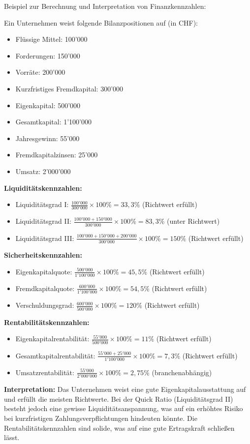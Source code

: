\begin{example}
Beispiel zur Berechnung und Interpretation von Finanzkennzahlen:

Ein Unternehmen weist folgende Bilanzpositionen auf (in CHF):
\begin{itemize}
    \item Flüssige Mittel: 100'000
    \item Forderungen: 150'000
    \item Vorräte: 200'000
    \item Kurzfristiges Fremdkapital: 300'000
    \item Eigenkapital: 500'000
    \item Gesamtkapital: 1'100'000
    \item Jahresgewinn: 55'000
    \item Fremdkapitalzinsen: 25'000
    \item Umsatz: 2'000'000
\end{itemize}

\textbf{Liquiditätskennzahlen:}
\begin{itemize}
    \item Liquiditätsgrad I: $\frac{100'000}{300'000} \times 100\% = 33,3\%$ (Richtwert erfüllt)
    \item Liquiditätsgrad II: $\frac{100'000 + 150'000}{300'000} \times 100\% = 83,3\%$ (unter Richtwert)
    \item Liquiditätsgrad III: $\frac{100'000 + 150'000 + 200'000}{300'000} \times 100\% = 150\%$ (Richtwert erfüllt)
\end{itemize}

\textbf{Sicherheitskennzahlen:}
\begin{itemize}
    \item Eigenkapitalquote: $\frac{500'000}{1'100'000} \times 100\% = 45,5\%$ (Richtwert erfüllt)
    \item Fremdkapitalquote: $\frac{600'000}{1'100'000} \times 100\% = 54,5\%$ (Richtwert erfüllt)
    \item Verschuldungsgrad: $\frac{600'000}{500'000} \times 100\% = 120\%$ (Richtwert erfüllt)
\end{itemize}

\textbf{Rentabilitätskennzahlen:}
\begin{itemize}
    \item Eigenkapitalrentabilität: $\frac{55'000}{500'000} \times 100\% = 11\%$ (Richtwert erfüllt)
    \item Gesamtkapitalrentabilität: $\frac{55'000 + 25'000}{1'100'000} \times 100\% = 7,3\%$ (Richtwert erfüllt)
    \item Umsatzrentabilität: $\frac{55'000}{2'000'000} \times 100\% = 2,75\%$ (branchenabhängig)
\end{itemize}

\textbf{Interpretation:} Das Unternehmen weist eine gute Eigenkapitalausstattung auf und erfüllt die meisten Richtwerte. Bei der Quick Ratio (Liquiditätsgrad II) besteht jedoch eine gewisse Liquiditätsanspannung, was auf ein erhöhtes Risiko bei kurzfristigen Zahlungsverpflichtungen hindeuten könnte. Die Rentabilitätskennzahlen sind solide, was auf eine gute Ertragskraft schließen lässt.
\end{example}
